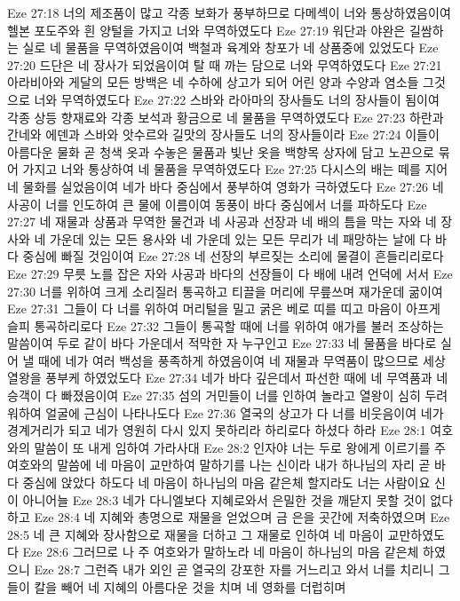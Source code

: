 Eze 27:18  너의 제조품이 많고 각종 보화가 풍부하므로 다메섹이 너와 통상하였음이여 헬본 포도주와 흰 양털을 가지고 너와 무역하였도다
Eze 27:19  워단과 야완은 길쌈하는 실로 네 물품을 무역하였음이여 백철과 육계와 창포가 네 상품중에 있었도다
Eze 27:20  드단은 네 장사가 되었음이여 탈 때 까는 담으로 너와 무역하였도다
Eze 27:21  아라비아와 게달의 모든 방백은 네 수하에 상고가 되어 어린 양과 수양과 염소들 그것으로 너와 무역하였도다
Eze 27:22  스바와 라아마의 장사들도 너의 장사들이 됨이여 각종 상등 향재료와 각종 보석과 황금으로 네 물품을 무역하였도다
Eze 27:23  하란과 간네와 에덴과 스바와 앗수르와 길맛의 장사들도 너의 장사들이라
Eze 27:24  이들이 아름다운 물화 곧 청색 옷과 수놓은 물품과 빛난 옷을 백향목 상자에 담고 노끈으로 묶어 가지고 너와 통상하여 네 물품을 무역하였도다
Eze 27:25  다시스의 배는 떼를 지어 네 물화를 실었음이여 네가 바다 중심에서 풍부하여 영화가 극하였도다
Eze 27:26  네 사공이 너를 인도하여 큰 물에 이름이여 동풍이 바다 중심에서 너를 파하도다
Eze 27:27  네 재물과 상품과 무역한 물건과 네 사공과 선장과 네 배의 틈을 막는 자와 네 장사와 네 가운데 있는 모든 용사와 네 가운데 있는 모든 무리가 네 패망하는 날에 다 바다 중심에 빠질 것임이여
Eze 27:28  네 선장의 부르짖는 소리에 물결이 흔들리리로다
Eze 27:29  무릇 노를 잡은 자와 사공과 바다의 선장들이 다 배에 내려 언덕에 서서
Eze 27:30  너를 위하여 크게 소리질러 통곡하고 티끌을 머리에 무릎쓰며 재가운데 굶이여
Eze 27:31  그들이 다 너를 위하여 머리털을 밀고 굵은 베로 띠를 띠고 마음이 아프게 슬피 통곡하리로다
Eze 27:32  그들이 통곡할 때에 너를 위하여 애가를 불러 조상하는 말씀이여 두로 같이 바다 가운데서 적막한 자 누구인고
Eze 27:33  네 물품을 바다로 실어 낼 때에 네가 여러 백성을 풍족하게 하였음이여 네 재물과 무역품이 많으므로 세상 열왕을 풍부케 하였었도다
Eze 27:34  네가 바다 깊은데서 파선한 때에 네 무역품과 네 승객이 다 빠졌음이여
Eze 27:35  섬의 거민들이 너를 인하여 놀라고 열왕이 심히 두려워하여 얼굴에 근심이 나타나도다
Eze 27:36  열국의 상고가 다 너를 비웃음이여 네가 경계거리가 되고 네가 영원히 다시 있지 못하리라 하리로다 하셨다 하라
Eze 28:1  여호와의 말씀이 또 내게 임하여 가라사대
Eze 28:2  인자야 너는 두로 왕에게 이르기를 주 여호와의 말씀에 네 마음이 교만하여 말하기를 나는 신이라 내가 하나님의 자리 곧 바다 중심에 앉았다 하도다 네 마음이 하나님의 마음 같은체 할지라도 너는 사람이요 신이 아니어늘
Eze 28:3  네가 다니엘보다 지혜로와서 은밀한 것을 깨닫지 못할 것이 없다하고
Eze 28:4  네 지혜와 총명으로 재물을 얻었으며 금 은을 곳간에 저축하였으며
Eze 28:5  네 큰 지혜와 장사함으로 재물을 더하고 그 재물로 인하여 네 마음이 교만하였도다
Eze 28:6  그러므로 나 주 여호와가 말하노라 네 마음이 하나님의 마음 같은체 하였으니
Eze 28:7  그런즉 내가 외인 곧 열국의 강포한 자를 거느리고 와서 너를 치리니 그들이 칼을 빼어 네 지혜의 아름다운 것을 치며 네 영화를 더럽히며
